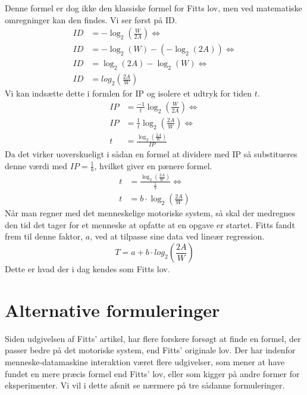 Denne formel er dog ikke den klassiske formel for Fitts lov, men ved matematiske omregninger kan den findes. Vi ser først på ID.
\begin{align*}
ID &= -\log_2\left(\frac{W}{2A}\right) \Leftrightarrow\\
ID &= -\log_2\left(W\right)-\left(-\log_2\left(2A\right)\right) \Leftrightarrow\\
ID &= \log_2\left(2A\right)-\log_2\left(W\right) \Leftrightarrow\\
ID &= log_2\left(\frac{2A}{W}\right)
\end{align*}
Vi kan indsætte dette i formlen for IP og isolere et udtryk for tiden $t$.
\begin{align*}
IP &=\frac{-1}{t}\log_2\left(\frac{W}{2A}\right) \Leftrightarrow\\ 
IP &= \frac{1}{t}\log_2\left(\frac{2A}{W}\right) \Leftrightarrow\\ 
t &= \frac{\log_2\left(\frac{2A}{W}\right)}{IP}
\end{align*}
Da det virker uoverskueligt i sådan en formel at dividere med IP så substitueres denne værdi med $IP = \frac{1}{b}$, hvilket giver en pænere formel.
\begin{align*}
t &= \frac{\log_2\left(\frac{2A}{W}\right)}{\frac{1}{b}} \Leftrightarrow\\ 
t &= b \cdot \log_2\left(\frac{2A}{W}\right)
\end{align*}
Når man regner med det menneskelige motoriske system, så skal der medregnes den tid det tager for et menneske at opfatte at en opgave er startet. Fitts fandt frem til denne faktor, $a$, ved at tilpasse sine data ved lineær regression.
\begin{equation}
\label{eq:FittsLov}
T = a + b \cdot log_2\left(\frac{2A}{W}\right)
\end{equation}
Dette er hvad der i dag kendes som Fitts lov.

\section*{Alternative formuleringer}
Siden udgivelsen af Fitts’ artikel, har flere forskere forsøgt at finde en formel, der passer bedre på det motoriske system, end Fitts’ originale lov. Der har indenfor menneske-datamaskine interaktion været flere udgivelser, som mener at have fundet en mere præcis formel end Fitts’ lov, eller som kigger på andre former for eksperimenter. Vi vil i dette afsnit se nærmere på tre sådanne formuleringer.

